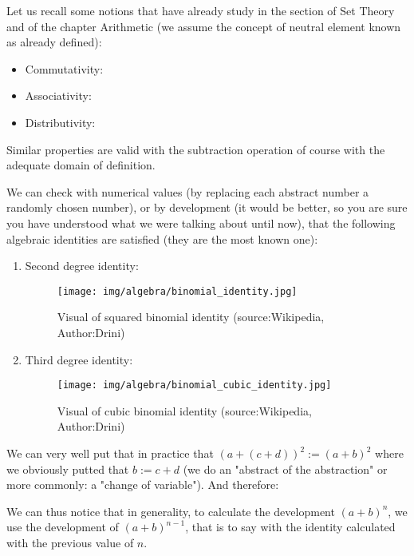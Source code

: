 	Let us recall some notions that have already study in the section of Set Theory and of the chapter Arithmetic (we assume the concept of neutral element known as already defined):
	\begin{itemize}
		\item Commutativity:
		
		
		\item Associativity:
		
		
		\item Distributivity:
		
	\end{itemize}
	Similar properties are valid with the subtraction operation of course with the adequate domain of definition.
	
	\pagebreak
	We can check with numerical values (by replacing each abstract number a randomly chosen number), or by development (it would be better, so you are sure you have understood what we were talking about until now), that the following algebraic identities are satisfied (they are the most known one):
	\begin{enumerate}
		\item Second degree identity:
		
		\begin{figure}[H]
			\centering
			\texttt{[image: img/algebra/binomial\_identity.jpg]}
			\caption[]{Visual of squared binomial identity (source:Wikipedia, Author:Drini)}
		\end{figure}
	
		\item Third degree identity:
		
		\begin{figure}[H]
			\centering
			\texttt{[image: img/algebra/binomial\_cubic\_identity.jpg]}
			\caption[]{Visual of cubic binomial identity (source:Wikipedia, Author:Drini)}
		\end{figure}
	\end{enumerate}
	\begin{tcolorbox}[title=Remark,colframe=black,arc=10pt]
	We can very well put that in practice that $(a+(c+d))^2:=(a+b)^2$ where we obviously putted that $b:=c+d$ (we do an "abstract of the abstraction" or more commonly: a "change of variable"). And therefore:
	
	\end{tcolorbox}
	We can thus notice that in generality, to calculate the development $(a+b)^n$, we use the development of $(a+b)^{n-1}$, that is to say with the identity calculated with the previous value of $n$.
	

